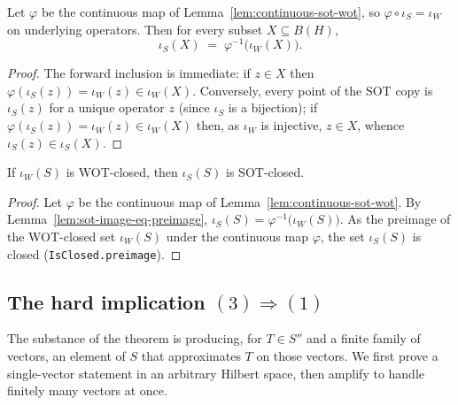 \begin{lemma}
    \label{lem:sot-image-eq-preimage}
    \leanok
    Let $\varphi$ be the continuous map of Lemma~\ref{lem:continuous-sot-wot},
    so $\varphi \circ \iota_S = \iota_W$ on underlying operators. Then for every
    subset $X \subseteq B(H)$,
    \[
        \iota_S(X) \;=\; \varphi^{-1}\bigl(\iota_W(X)\bigr).
    \]
\end{lemma}
\begin{proof}
    The forward inclusion is immediate: if $z \in X$ then
    $\varphi(\iota_S(z)) = \iota_W(z) \in \iota_W(X)$. Conversely, every point of
    the SOT copy is $\iota_S(z)$ for a unique operator $z$ (since $\iota_S$ is a
    bijection); if $\varphi(\iota_S(z)) = \iota_W(z) \in \iota_W(X)$ then, as
    $\iota_W$ is injective, $z \in X$, whence $\iota_S(z) \in \iota_S(X)$.
\end{proof}

\begin{lemma}
    \label{lem:wot-closed-imp-sot-closed}
    \leanok
    If $\iota_W(S)$ is WOT-closed, then $\iota_S(S)$ is SOT-closed.
\end{lemma}
\begin{proof}
    Let $\varphi$ be the continuous map of Lemma~\ref{lem:continuous-sot-wot}. By
    Lemma~\ref{lem:sot-image-eq-preimage},
    $\iota_S(S) = \varphi^{-1}\bigl(\iota_W(S)\bigr)$. As the preimage of the
    WOT-closed set $\iota_W(S)$ under the continuous map $\varphi$, the set
    $\iota_S(S)$ is closed (\texttt{IsClosed.preimage}).
\end{proof}

\subsection{The hard implication \texorpdfstring{$(3) \Rightarrow (1)$}{(3) => (1)}}

The substance of the theorem is producing, for $T \in S''$ and a finite family of
vectors, an element of $S$ that approximates $T$ on those vectors. We first prove
a single-vector statement in an arbitrary Hilbert space, then amplify to handle
finitely many vectors at once.

